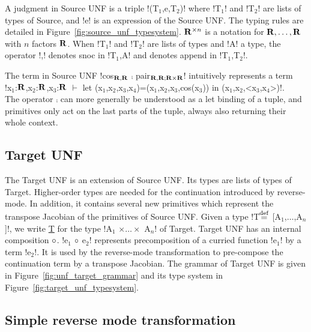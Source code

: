 A judgment in Source UNF is a triple !(T$_1$,e,T$_2$)! where !T$_1$! and !T$_2$! are lists of types of Source, and !e! is an expression of the Source UNF.
The typing rules are detailed in Figure~\ref{fig:source_unf_typesystem}.
$\mathbf{R}^{\times n}$ is a notation for $\mathbf{R},\ldots,\mathbf{R}$ with $n$ factors $\mathbf{R}$. 
When !T$_1$! and !T$_2$! are lists of types and !A! a type, the operator !,! denotes snoc in !T$_1$,A! and denotes append in !T$_1$,T$_2$!.



\begin{example}
    The term in Source UNF !cos$_{\mathbf{R},\mathbf{R}}$ $\comp$ pair$_{\mathbf{R},\mathbf{R}; \mathbf{R}\times\mathbf{R}}$! 
    intuitively represents a term \\
    !x$_1$:$\mathbf{R}$,x$_2$:$\mathbf{R}$,x$_3$:$\mathbf{R}$ $\vdash$ let (x$_1$,x$_2$,x$_3$,x$_4$)=(x$_1$,x$_2$,x$_3$,cos(x$_3$)) in (x$_1$,x$_2$,<x$_3$,x$_4$>)!.\\
    The operator $\comp$ can more generally be understood as a let binding of a tuple, and primitives only act on the last parts of the tuple, always also returning their whole context.
\end{example}

\subsection{Target UNF} %
\label{sub:Target UNF}

The Target UNF is an extension of Source UNF. 
Its types are lists of types of Target. 
Higher-order types are needed for the continuation introduced by reverse-mode. 
In addition, it contains several new primitives which represent the transpose Jacobian of the primitives of Source UNF.
Given a type !T$\stackrel {\mathrm{def}}=$ [A$_1$,$\ldots$,A$_n$]!, we write \underline{T} for the type !A$_1$ $\times\ldots\times$ A$_n$! of Target. 
Target UNF has an internal composition $\circ$. 
!e$_{1}$ $\circ$ e$_{2}$! represents precomposition of a curried function !e$_{1}$! by a term !e$_{2}$!.
It is used by the reverse-mode transformation to pre-compose the continuation term by a transpose Jacobian.
The grammar of Target UNF is given in Figure~\ref{fig:unf_target_grammar} and its type system in Figure~\ref{fig:target_unf_typesystem}.





\subsection{Simple reverse mode transformation} %
\label{sub:Simple reverse mode transformation}

